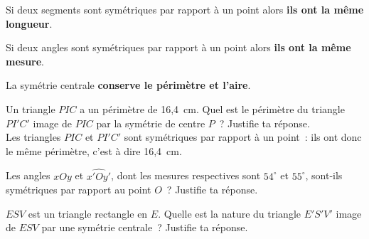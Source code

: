 \begin{methode*1}

\begin{aconnaitre}
Si deux segments sont symétriques par rapport à un point alors \textbf{ils ont la même longueur}.

Si deux angles sont symétriques par rapport à un point alors \textbf{ils ont la même mesure}.

La symétrie centrale \textbf{conserve le périmètre et l'aire}.
\end{aconnaitre}

\begin{exemple*1}
Un triangle $PIC$ a un périmètre de 16,4 cm. Quel est le périmètre du triangle $PI'C'$ image de $PIC$ par la symétrie de centre $P$ ? Justifie ta réponse.\\[1em]
\correction
Les triangles $PIC$ et $PI'C'$ sont symétriques par rapport à un point : ils ont donc le même périmètre, c'est à dire 16,4 cm.
 \end{exemple*1}


\exercice
Les angles $\widehat{xOy}$ et $\widehat{x'Oy'}$, dont les mesures respectives sont $54^{\circ}$ et $55^{\circ}$, sont-ils symétriques par rapport au point $O$ ? Justifie ta réponse.

\exercice
$ESV$ est un triangle rectangle en $E$. Quelle est la nature du triangle $E'S'V'$ image de $ESV$ par une symétrie centrale ? Justifie ta réponse.
 
\end{methode*1}

